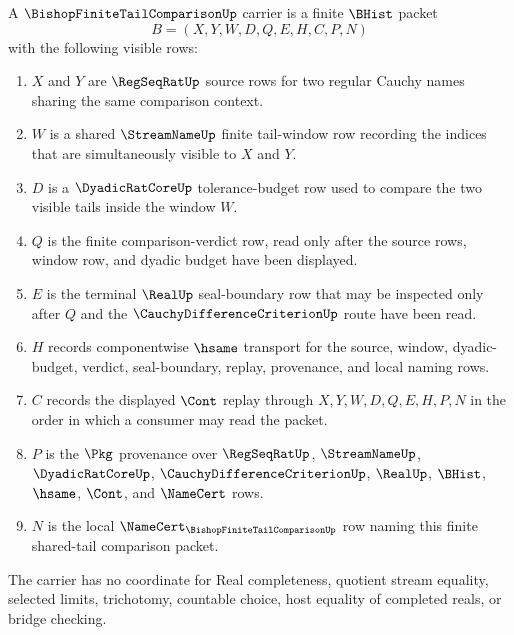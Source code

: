 \begin{definition}
\label{def:bishop-finite-tail-comparison-carrier}
A $\BishopFiniteTailComparisonUp$ carrier is a finite $\BHist$ packet
$$
B=(X,Y,W,D,Q,E,H,C,P,N)
$$
with the following visible rows:
\begin{enumerate}
\item $X$ and $Y$ are $\RegSeqRatUp$ source rows for two regular Cauchy names sharing the same comparison context.
\item $W$ is a shared $\StreamNameUp$ finite tail-window row recording the indices that are simultaneously visible to $X$ and $Y$.
\item $D$ is a $\DyadicRatCoreUp$ tolerance-budget row used to compare the two visible tails inside the window $W$.
\item $Q$ is the finite comparison-verdict row, read only after the source rows, window row, and dyadic budget have been displayed.
\item $E$ is the terminal $\RealUp$ seal-boundary row that may be inspected only after $Q$ and the $\CauchyDifferenceCriterionUp$ route have been read.
\item $H$ records componentwise $\hsame$ transport for the source, window, dyadic-budget, verdict, seal-boundary, replay, provenance, and local naming rows.
\item $C$ records the displayed $\Cont$ replay through $X,Y,W,D,Q,E,H,P,N$ in the order in which a consumer may read the packet.
\item $P$ is the $\Pkg$ provenance over $\RegSeqRatUp$, $\StreamNameUp$, $\DyadicRatCoreUp$, $\CauchyDifferenceCriterionUp$, $\RealUp$, $\BHist$, $\hsame$, $\Cont$, and $\NameCert$ rows.
\item $N$ is the local $\NameCert_{\BishopFiniteTailComparisonUp}$ row naming this finite shared-tail comparison packet.
\end{enumerate}
The carrier has no coordinate for Real completeness, quotient stream equality, selected limits, trichotomy, countable choice, host equality of completed reals, or bridge checking.
\end{definition}

